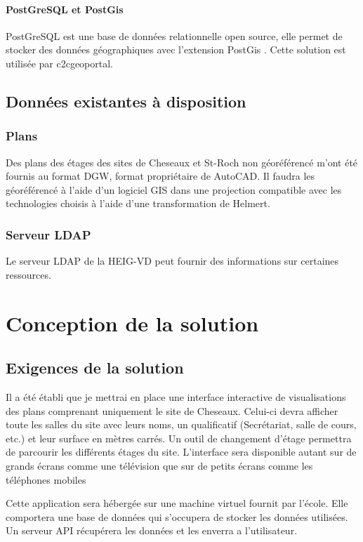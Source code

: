\documentclass[
    iai, %
    il, %
]{heig-tb}
\begin{document}
\subsubsection{PostGreSQL et PostGis}
PostGreSQL est une base de données relationnelle open source, elle permet de stocker des données géographiques avec l'extension PostGis  \cite{postgis}.
Cette solution est utilisée par c2cgeoportal.

\section{Données existantes à disposition}
\subsection{Plans}
Des plans des étages des sites de Cheseaux et St-Roch non géoréférencé m'ont été fournis au format DGW, format propriétaire de AutoCAD.
Il faudra les géoréférencé à l'aide d'un logiciel GIS dans une projection compatible avec les technologies choisis à l'aide d'une transformation de Helmert.

\subsection{Serveur LDAP}
Le serveur LDAP de la HEIG-VD peut fournir des informations sur certaines ressources.




\chapter{Conception de la solution}
\section{Exigences de la solution}
Il a été établi que je mettrai en place une interface interactive de visualisations des plans comprenant uniquement le site de Cheseaux.
Celui-ci devra afficher toute les salles du site avec leurs noms, un qualificatif (Secrétariat, salle de cours, etc.) et leur surface en mètres carrés.
Un outil de changement d'étage permettra de parcourir les différents étages du site.
L'interface sera disponible autant sur de grands écrans comme une télévision que sur de petits écrans comme les téléphones mobiles

Cette application sera hébergée sur une machine virtuel fournit par l'école.
Elle comportera une base de données qui s'occupera de stocker les données utilisées.
Un serveur API récupérera les données et les enverra a l'utilisateur.
\end{document}

